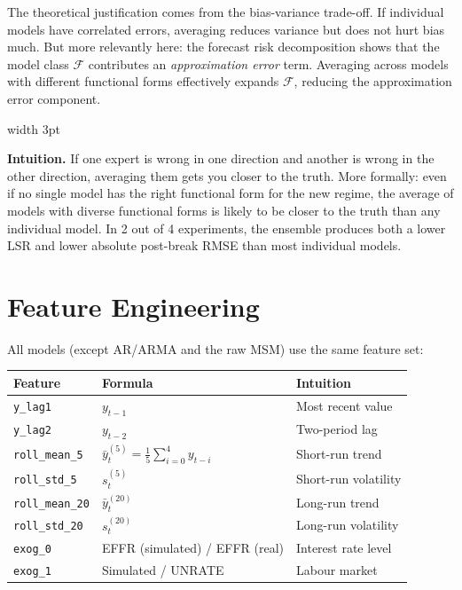 \documentclass[11pt, a4paper]{article}
\newenvironment{intubox}{%
  \vspace{4pt}\par\noindent%
  {\color{darkblue}\vrule width 3pt}\hspace{6pt}%
  \begin{minipage}{\dimexpr\linewidth-9pt\relax}\vspace{2pt}%
}{%
  \vspace{2pt}\end{minipage}\par\vspace{4pt}%
}
\begin{document}
The theoretical justification comes from the bias-variance trade-off. If
individual models have correlated errors, averaging reduces variance but does
not hurt bias much. But more relevantly here: the forecast risk decomposition
shows that the model class $\mathcal{F}$ contributes an \emph{approximation
error} term. Averaging across models with different functional forms effectively
expands $\mathcal{F}$, reducing the approximation error component.

\begin{intubox}
\textbf{Intuition.}
If one expert is wrong in one direction and another is wrong in the other
direction, averaging them gets you closer to the truth. More formally: even if
no single model has the right functional form for the new regime, the average
of models with diverse functional forms is likely to be closer to the truth
than any individual model. In 2 out of 4 experiments, the ensemble produces
both a lower LSR and lower absolute post-break RMSE than most individual models.
\end{intubox}

\section{Feature Engineering}

All models (except AR/ARMA and the raw MSM) use the same feature set:

\begin{center}
\begin{tabular}{lll}
  \toprule
  Feature & Formula & Intuition \\
  \midrule
  \texttt{y\_lag1} & $y_{t-1}$ & Most recent value \\
  \texttt{y\_lag2} & $y_{t-2}$ & Two-period lag \\
  \texttt{roll\_mean\_5} & $\bar{y}^{(5)}_t = \frac{1}{5}\sum_{i=0}^4 y_{t-i}$ & Short-run trend \\
  \texttt{roll\_std\_5} & $s^{(5)}_t$ & Short-run volatility \\
  \texttt{roll\_mean\_20} & $\bar{y}^{(20)}_t$ & Long-run trend \\
  \texttt{roll\_std\_20} & $s^{(20)}_t$ & Long-run volatility \\
  \texttt{exog\_0} & EFFR (simulated) / EFFR (real) & Interest rate level \\
  \texttt{exog\_1} & Simulated / UNRATE & Labour market \\
  \bottomrule
\end{tabular}
\end{center}
\end{document}
